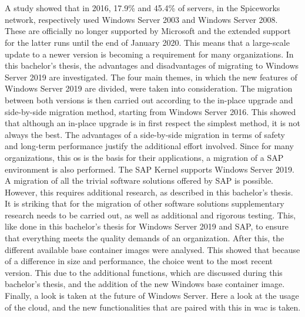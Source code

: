 \chapter*{}
A study showed that in 2016, 17.9\% and 45.4\% of servers, in the Spiceworks network, respectively used Windows Server 2003 and Windows Server 2008. \autocite{Tsai2016} 
These are officially no longer supported by Microsoft and the extended support for the latter runs until the end of January 2020. 
This means that a large-scale update to a newer version is becoming a requirement for many organizations. 
In this bachelor's thesis, the advantages and disadvantages of migrating to Windows Server 2019 are investigated. 
The four main themes, in which the new features of Windows Server 2019 are divided, were taken into consideration. 
The migration between both versions is then carried out according to the in-place upgrade and side-by-side migration method, starting from Windows Server 2016. 
This showed that although an in-place upgrade is in first respect the simplest method, it is not always the best. 
The advantages of a side-by-side migration in terms of safety and long-term performance justify the additional effort involved.
Since for many organizations, this \acrshort{os} is the basis for their applications, a migration of a SAP environment is also performed. 
The SAP Kernel supports Windows Server 2019. 
A migration of all the trivial software solutions offered by SAP is possible.
However, this requires additional research, as described in this bachelor's thesis.
It is striking that for the migration of other software solutions supplementary research needs to be carried out, as well as additional and rigorous testing. 
This, like done in this bachelor's thesis for Windows Server 2019 and SAP, to ensure that everything meets the quality demands of an organization.
After this, the different available base container images were analysed. 
This showed that because of a difference in size and performance, the choice went to the most recent version. 
This due to the additional functions, which are discussed during this bachelor's thesis, and the addition of the new Windows base container image.
Finally, a look is taken at the future of Windows Server. 
Here a look at the usage of the cloud, and the new functionalities that are paired with this in \acrlong{wac} is taken. 
